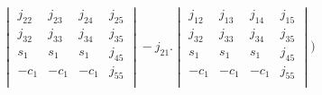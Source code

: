 \begin{align}
\begin{vmatrix}
                        j_{22} & j_{23} & j_{24} & j_{25} \\
                        j_{32} & j_{33} & j_{34} & j_{35} \\
                        s_1  &   s_1  &   s_1  & j_{45} \\
                        -c_1  &  -c_1  &  -c_1  & j_{55} \\        
                    \end{vmatrix} - j_{21}.\begin{vmatrix}
                                            j_{12} & j_{13} & j_{14} & j_{15} \\
                                            j_{32} & j_{33} & j_{34} & j_{35} \\
                                            s_1  &   s_1  &   s_1  & j_{45} \\
                                            -c_1  &  -c_1  &  -c_1  & j_{55} \\               
                                        \end{vmatrix} \Bigg) \label{eq:det2}
\end{align}
%
%

